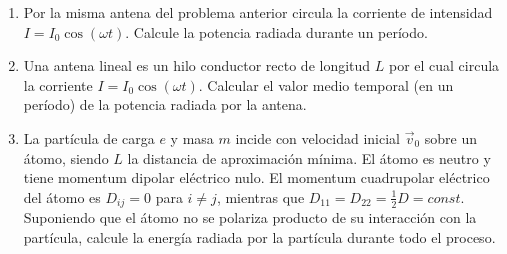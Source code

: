 \documentclass[12pt,a4paper]{book}
\begin{document}
\begin{enumerate}
\item Por la misma antena del problema anterior circula la corriente de intensidad $I = I_0 \cos(\omega t)$. Calcule la potencia radiada durante un período.

\item Una antena lineal es un hilo conductor recto de longitud $L$ por el cual circula la corriente $I = I_0 \cos(\omega t)$. Calcular el valor medio temporal (en un período) de la potencia radiada por la antena.

\item La partícula de carga $e$ y masa $m$ incide con velocidad inicial $\vec{v}_0$ sobre un átomo, siendo $L$ la distancia de aproximación mínima. El átomo es neutro y tiene momentum dipolar eléctrico nulo. El momentum cuadrupolar eléctrico del átomo es $D_{ij} = 0$ para $i \neq j$, mientras que $D_{11} = D_{22} = \frac{1}{2}D = const$. Suponiendo que el átomo no se polariza producto de su interacción con la partícula, calcule la energía radiada por la partícula durante todo el proceso.
\end{enumerate}
\end{document}
